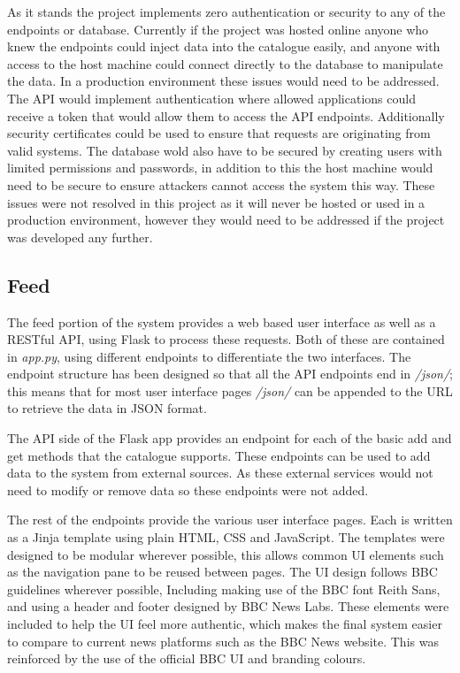 \documentclass[12pt,titlepage]{article}
\begin{document}
  As it stands the project implements zero authentication or security to any of
  the endpoints or database. Currently if the project was hosted online anyone
  who knew the endpoints could inject data into the catalogue easily, and anyone
  with access to the host machine could connect directly to the database to
  manipulate the data. In a production environment these issues would need to be
  addressed. The API would implement authentication where allowed applications
  could receive a token that would allow them to access the API endpoints.
  Additionally security certificates could be used to ensure that requests are
  originating from valid systems. The database wold also have to be secured by
  creating users with limited permissions and passwords, in addition to this the
  host machine would need to be secure to ensure attackers cannot access the
  system this way. These issues were not resolved in this project as it will
  never be hosted or used in a production environment, however they would need
  to be addressed if the project was developed any further.

  \subsection{Feed}

  The feed portion of the system provides a web based user interface as well as
  a RESTful API, using Flask to process these requests. Both of these are
  contained in \textit{app.py}, using different endpoints to differentiate the
  two interfaces. The endpoint structure has been designed so that all the API
  endpoints end in \textit{/json/}; this means that for most user interface
  pages \textit{/json/} can be appended to the URL to retrieve the data in JSON
  format.

  The API side of the Flask app provides an endpoint for each of the basic add
  and get methods that the catalogue supports. These endpoints can be used to
  add data to the system from external sources. As these external services would
  not need to modify or remove data so these endpoints were not added.

  The rest of the endpoints provide the various user interface pages. Each is
  written as a Jinja template using plain HTML, CSS and JavaScript. The
  templates were designed to be modular wherever possible, this allows common UI
  elements such as the navigation pane to be reused between pages. The UI design
  follows BBC guidelines wherever possible, Including making use of the BBC font
  Reith Sans, and using a header and footer designed by BBC News Labs. These
  elements were included to help the UI feel more authentic, which makes the
  final system easier to compare to current news platforms such as the BBC News
  website. This was reinforced by the use of the official BBC UI and branding
  colours.
\end{document}
